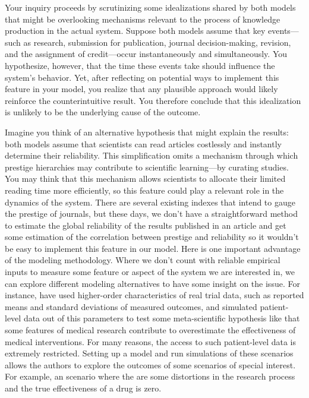 \documentclass{article}
\begin{document}
Your inquiry proceeds by scrutinizing some idealizations shared by both models that might be overlooking mechanisms relevant to the process of knowledge production in the actual system. Suppose both models assume that key events—such as research, submission for publication, journal decision-making, revision, and the assignment of credit—occur instantaneously and simultaneously. You hypothesize, however, that the time these events take should influence the system's behavior. Yet, after reflecting on potential ways to implement this feature in your model, you realize that any plausible approach would likely reinforce the counterintuitive result. You therefore conclude that this idealization is unlikely to be the underlying cause of the outcome.

Imagine you think of an alternative hypothesis that might explain the results: both models assume that scientists can read articles costlessly and instantly determine their reliability. This simplification omits a mechanism through which prestige hierarchies may contribute to scientific learning—by curating studies. You may think that this mechanism allows scientists to allocate their limited reading time more efficiently, so this feature could play a relevant role in the dynamics of the system. There are several existing indexes that intend to gauge the prestige of journals, but these days, we don't have a straightforward method to estimate the global reliability of the results published in an article and get some estimation of the correlation between prestige and reliability so it wouldn't be easy to implement this feature in our model. Here is one important advantage of the modeling methodology. Where we don't count with reliable empirical inputs to measure some feature or aspect of the system we are interested in, we can explore different modeling alternatives to have some insight on the issue. For instance,  have used higher-order characteristics of real trial data, such as reported means and standard deviations of measured outcomes, and simulated patient-level data out of this parameters to test some meta-scientific hypothesis like that some features of medical research contribute to overestimate the effectiveness of medical interventions. For many reasons, the access to such patient-level data is extremely restricted. Setting up a model and run simulations of these scenarios allows the authors to explore the outcomes of some scenarios of special interest. For example, an scenario where the are some distortions in the research process and the true effectiveness of a drug is zero.
\end{document}
